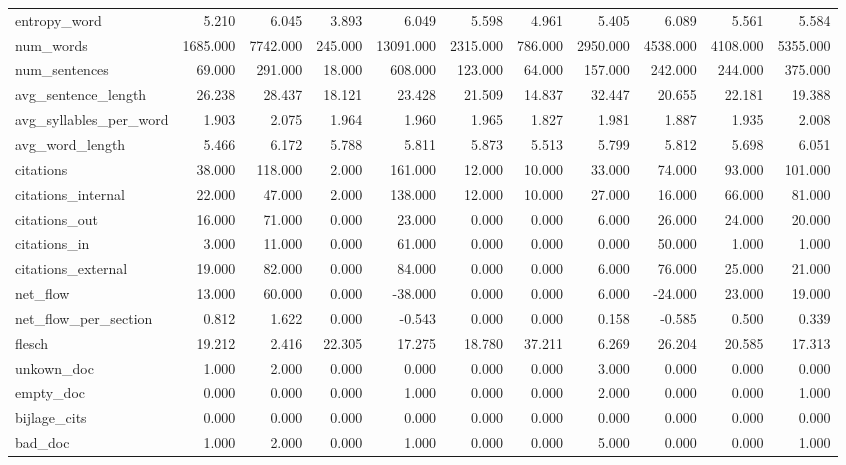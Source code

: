 \begin{tabular}{lrrrrrrrrrr}
\cline{1-11}
entropy\_word & 5.210 & 6.045 & 3.893 & 6.049 & 5.598 & 4.961 & 5.405 & 6.089 & 5.561 & 5.584 \\
\cline{1-11}
num\_words & 1685.000 & 7742.000 & 245.000 & 13091.000 & 2315.000 & 786.000 & 2950.000 & 4538.000 & 4108.000 & 5355.000 \\
\cline{1-11}
num\_sentences & 69.000 & 291.000 & 18.000 & 608.000 & 123.000 & 64.000 & 157.000 & 242.000 & 244.000 & 375.000 \\
\cline{1-11}
avg\_sentence\_length & 26.238 & 28.437 & 18.121 & 23.428 & 21.509 & 14.837 & 32.447 & 20.655 & 22.181 & 19.388 \\
\cline{1-11}
avg\_syllables\_per\_word & 1.903 & 2.075 & 1.964 & 1.960 & 1.965 & 1.827 & 1.981 & 1.887 & 1.935 & 2.008 \\
\cline{1-11}
avg\_word\_length & 5.466 & 6.172 & 5.788 & 5.811 & 5.873 & 5.513 & 5.799 & 5.812 & 5.698 & 6.051 \\
\cline{1-11}
citations & 38.000 & 118.000 & 2.000 & 161.000 & 12.000 & 10.000 & 33.000 & 74.000 & 93.000 & 101.000 \\
\cline{1-11}
citations\_internal & 22.000 & 47.000 & 2.000 & 138.000 & 12.000 & 10.000 & 27.000 & 16.000 & 66.000 & 81.000 \\
\cline{1-11}
citations\_out & 16.000 & 71.000 & 0.000 & 23.000 & 0.000 & 0.000 & 6.000 & 26.000 & 24.000 & 20.000 \\
\cline{1-11}
citations\_in & 3.000 & 11.000 & 0.000 & 61.000 & 0.000 & 0.000 & 0.000 & 50.000 & 1.000 & 1.000 \\
\cline{1-11}
citations\_external & 19.000 & 82.000 & 0.000 & 84.000 & 0.000 & 0.000 & 6.000 & 76.000 & 25.000 & 21.000 \\
\cline{1-11}
net\_flow & 13.000 & 60.000 & 0.000 & -38.000 & 0.000 & 0.000 & 6.000 & -24.000 & 23.000 & 19.000 \\
\cline{1-11}
net\_flow\_per\_section & 0.812 & 1.622 & 0.000 & -0.543 & 0.000 & 0.000 & 0.158 & -0.585 & 0.500 & 0.339 \\
\cline{1-11}
flesch & 19.212 & 2.416 & 22.305 & 17.275 & 18.780 & 37.211 & 6.269 & 26.204 & 20.585 & 17.313 \\
\cline{1-11}
unkown\_doc & 1.000 & 2.000 & 0.000 & 0.000 & 0.000 & 0.000 & 3.000 & 0.000 & 0.000 & 0.000 \\
\cline{1-11}
empty\_doc & 0.000 & 0.000 & 0.000 & 1.000 & 0.000 & 0.000 & 2.000 & 0.000 & 0.000 & 1.000 \\
\cline{1-11}
bijlage\_cits & 0.000 & 0.000 & 0.000 & 0.000 & 0.000 & 0.000 & 0.000 & 0.000 & 0.000 & 0.000 \\
\cline{1-11}
bad\_doc & 1.000 & 2.000 & 0.000 & 1.000 & 0.000 & 0.000 & 5.000 & 0.000 & 0.000 & 1.000 \\
\cline{1-11}
\bottomrule
\end{tabular}
